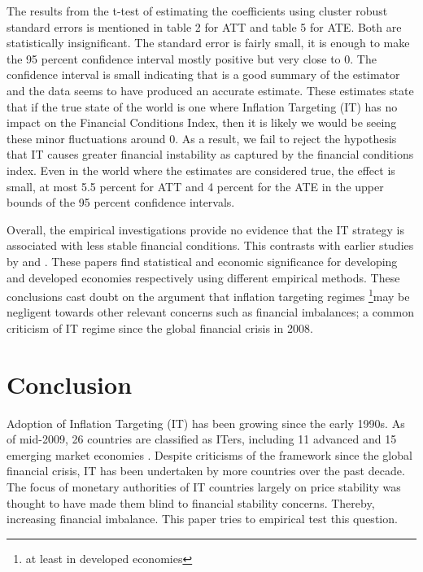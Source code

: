 \documentclass[12pt]{article}
\begin{document}
The results from the t-test of estimating the coefficients using cluster robust standard errors is mentioned in table 2 for ATT and table 5 for ATE. 
Both are statistically insignificant. The standard error is fairly small, it is enough to make the 95 percent confidence interval mostly positive but very close to 0. The confidence interval is small indicating that is a good summary of the estimator and the data seems to have produced an accurate estimate. 
These estimates state that if the true state of the world is one where Inflation Targeting (IT) has no impact on the Financial Conditions Index, then it is likely we would be seeing these minor fluctuations around 0. As a result, we fail to reject the hypothesis that IT causes greater financial instability as captured by the financial conditions index.
Even in the world where the estimates are considered true,  the effect is small, at most 5.5 percent for ATT and 4 percent for the ATE in the upper bounds of the 95 percent confidence intervals.

Overall, the empirical investigations provide no evidence that the IT strategy is associated with less stable financial conditions. This contrasts with earlier studies by \cite{RN4} and \cite{RN34}. These papers find statistical and economic significance for developing and developed economies respectively  using different empirical methods. These conclusions cast doubt on the argument that inflation targeting regimes \footnote{at least in developed economies}may be negligent towards other relevant concerns such as financial imbalances; a common criticism of IT regime since the global financial crisis in 2008. 

\pagebreak
\section{Conclusion}

Adoption of Inflation Targeting (IT) has been growing since the early 1990s. As of mid-2009, 26 countries are classified as ITers, including 11 advanced and 15 emerging market economies \citep{RN2}. Despite criticisms of the framework since the global financial crisis, IT has been undertaken by more countries over the past decade. The focus of monetary authorities of IT countries largely on price stability was thought to have made them blind to financial stability concerns. Thereby, increasing financial imbalance. This paper tries to empirical test this question.
\end{document}

